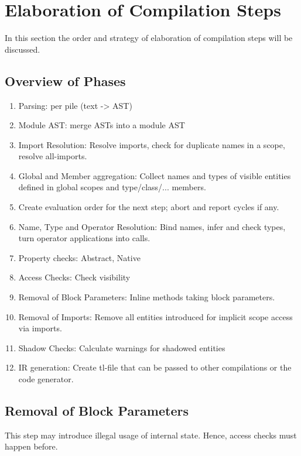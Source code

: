 \section{Elaboration of Compilation Steps}

In this section the order and strategy of elaboration of compilation steps will be discussed.

\subsection{Overview of Phases}

\begin{enumerate}
	\item Parsing: per pile (text -> AST)
	\item Module AST: merge ASTs into a module AST
	\item Import Resolution: Resolve imports, check for duplicate names in a scope, resolve all-imports.
	\item Global and Member aggregation: Collect names and types of visible entities defined in global scopes and type/class/... members.
	\item Create evaluation order for the next step; abort and report cycles if any.
	\item Name, Type and Operator Resolution: Bind names, infer and check types, turn operator applications into calls.
	\item Property checks: Abstract, Native
	\item Access Checks: Check visibility
	\item Removal of Block Parameters: Inline methods taking block parameters.
	\item Removal of Imports: Remove all entities introduced for implicit scope access via imports.
	\item Shadow Checks: Calculate warnings for shadowed entities
	\item IR generation: Create tl-file that can be passed to other compilations or the code generator.
\end{enumerate}


\subsection{Removal of Block Parameters}
This step may introduce illegal usage of internal state.
Hence, access checks must happen before.